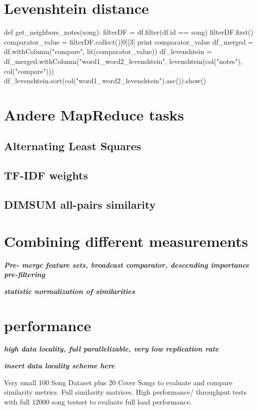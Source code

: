 \section{Levenshtein distance}

\begin{pythonCode}
def get_neighbors_notes(song):
    filterDF = df.filter(df.id == song)
    filterDF.first()
    comparator_value = filterDF.collect()[0][3] 
    print comparator_value
    df_merged = df.withColumn("compare", lit(comparator_value))
    df_levenshtein = df_merged.withColumn("word1_word2_levenshtein", levenshtein(col("notes"), col("compare")))
    df_levenshtein.sort(col("word1_word2_levenshtein").asc()).show()
\end{pythonCode}

\section{Andere MapReduce tasks}

\subsection{Alternating Least Squares}

\subsection{TF-IDF weights}

\subsection{DIMSUM all-pairs similarity}

\section{Combining different measurements}

\textit{\textbf{Pre- merge feature sets, broadcast comparator, descending importance pre-filtering}}

\textit{\textbf{statistic normalization of similarities}}

\section{performance}

\textit{\textbf{high data locality, full parallelizable, very low replication rate}}

\textit{\textbf{insert data locality scheme here}}

Very small 100 Song Dataset plus 20 Cover Songs to evaluate and compare similarity metrics. Full similarity matrices. 
High performance/ throughput tests with full 12000 song testset to evaluate full load performance.\\


